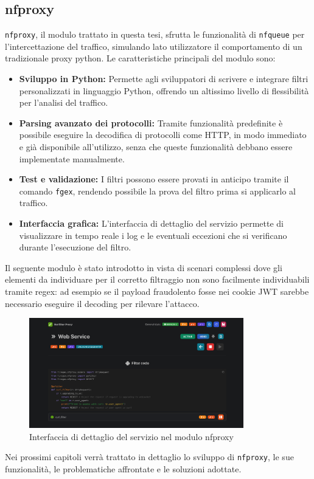 \subsection{nfproxy}
\texttt{nfproxy}, il modulo trattato in questa tesi, sfrutta le funzionalità di \texttt{nfqueue} per l'intercettazione del traffico, simulando lato utilizzatore il comportamento di un tradizionale proxy python. Le caratteristiche principali del modulo sono:
\begin{itemize}
    \setlength{\itemsep}{1pt}
    \setlength{\parskip}{1pt}
    \item \textbf{Sviluppo in Python:} Permette agli sviluppatori di scrivere e integrare filtri personalizzati in linguaggio Python, offrendo un altissimo livello di flessibilità per l'analisi del traffico.
    \item \textbf{Parsing avanzato dei protocolli:} Tramite funzionalità predefinite è possibile eseguire la decodifica di protocolli come HTTP, in modo immediato e già disponibile all'utilizzo, senza che queste funzionalità debbano essere implementate manualmente.
    \item \textbf{Test e validazione:} I filtri possono essere provati in anticipo tramite il comando \texttt{fgex}, rendendo possibile la prova del filtro prima si applicarlo al traffico.
    \item \textbf{Interfaccia grafica:} L'interfaccia di dettaglio del servizio permette di visualizzare in tempo reale i log e le eventuali eccezioni che si verificano durante l'esecuzione del filtro.
\end{itemize}

Il seguente modulo è stato introdotto in vista di scenari complessi dove gli elementi da individuare per il corretto filtraggio non sono facilmente individuabili tramite regex: ad esempio se il payload fraudolento fosse nei cookie JWT sarebbe necessario eseguire il decoding per rilevare l'attacco.\\

\begin{figure}[H]
    \centering
    \includegraphics[width=0.83\textwidth]{images/chapter2/NFProxyInterface.png}
    \caption{Interfaccia di dettaglio del servizio nel modulo nfproxy}\label{fig:nfproxy_interface}
\end{figure}

Nei prossimi capitoli verrà trattato in dettaglio lo sviluppo di \texttt{nfproxy}, le sue funzionalità, le problematiche affrontate e le soluzioni adottate.
